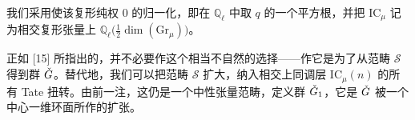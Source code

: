 \begin{remark}[权的归一化]
我们采用使该复形纯权 $0$ 的归一化，即在 $\mathbb{Q}_\ell$ 中取 $q$ 的一个平方根，并把 $\mathrm{IC}_\mu$ 记为相交复形张量上 $\mathbb{Q}_\ell\big(\tfrac12\dim(\mathrm{Gr}_\mu)\big)$。

正如 [15] 所指出的，并不必要作这个相当不自然的选择——作它是为了从范畴 $\mathcal S$ 得到群 $\check G$。替代地，我们可以把范畴 $\mathcal S$ 扩大，纳入相交上同调层 $\mathrm{IC}_\mu(n)$ 的所有 Tate 扭转。由前一注，这仍是一个中性张量范畴，定义群 $\check G_1$，它是 $\check G$ 被一个中心一维环面所作的扩张。
\end{remark}

